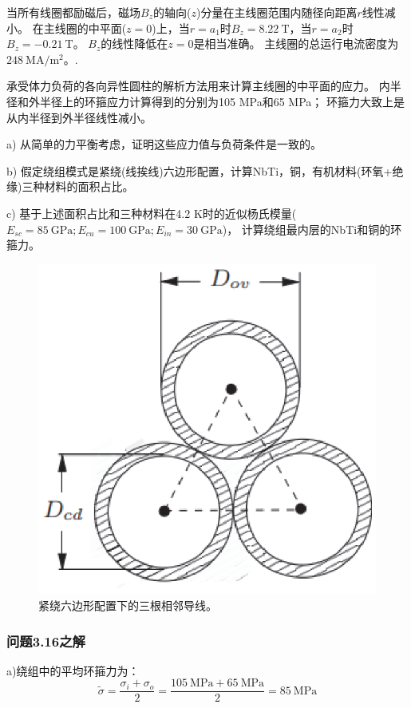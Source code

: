 当所有线圈都励磁后，磁场$B_z$的轴向($z$)分量在主线圈范围内随径向距离$r$线性减小。
在主线圈的中平面($z = 0$)上，当$r = a_1$时$B_z=8.22\ \mathrm{T} $，当$r = a_2$时$B_z=-0.21\ \mathrm{T} $。
$B_z$的线性降低在$z=0$是相当准确。
主线圈的总运行电流密度为$248\ \mathrm{MA/m^2} $。.

承受体力负荷的各向异性圆柱的解析方法用来计算主线圈的中平面的应力。
内半径和外半径上的环箍应力计算得到的分别为105 MPa和65 MPa；
环箍力大致上是从内半径到外半径线性减小。

a) 从简单的力平衡考虑，证明这些应力值与负荷条件是一致的。

b) 假定绕组模式是紧绕(线挨线)六边形配置，计算NbTi，铜，有机材料(环氧+绝缘)三种材料的面积占比。

c) 基于上述面积占比和三种材料在4.2 K时的近似杨氏模量($E_{sc} = 85\ \mathrm{GPa}  ; E_{cu} = 100\ \mathrm{GPa}; E_{in} = 30 \ \mathrm{GPa}$)，
计算绕组最内层的NbTi和铜的环箍力。
\begin{figure}[htbp]
	\centering
	\includegraphics[scale=0.6]{chpt3/figs/fig3.45.eps}
	\caption{紧绕六边形配置下的三根相邻导线。}
\end{figure}


\subsubsection{问题3.16之解}
a)绕组中的平均环箍力为：
\begin{equation*}
\tilde{\sigma}=\frac{\sigma_{i}+\sigma_{o}}{2}=\frac{105\ \mathrm{MPa}+65\ \mathrm{MPa}}{2}%
=85\ \mathrm{MPa}\tag{S16.1}
\end{equation*}

